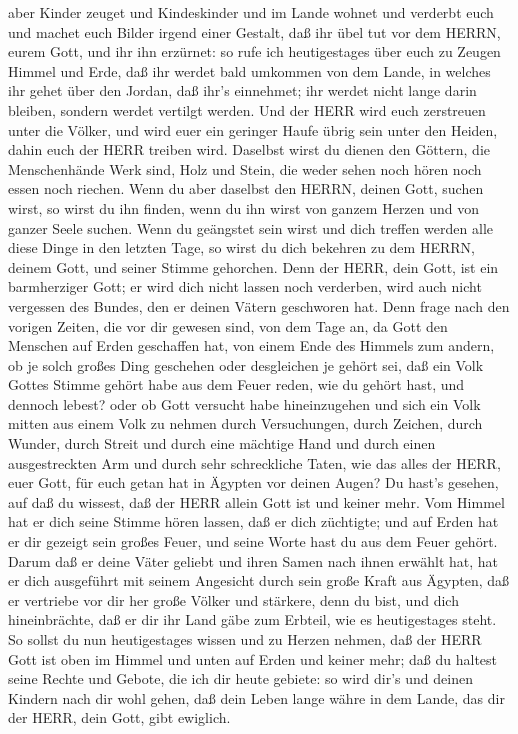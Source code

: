 aber Kinder zeuget und Kindeskinder und im Lande wohnet und verderbt
euch und machet euch Bilder irgend einer Gestalt, daß ihr übel tut vor
dem HERRN, eurem Gott, und ihr ihn erzürnet:  so rufe ich
heutigestages über euch zu Zeugen Himmel und Erde, daß ihr werdet bald
umkommen von dem Lande, in welches ihr gehet über den Jordan, daß ihr's
einnehmet; ihr werdet nicht lange darin bleiben, sondern werdet vertilgt
werden.  Und der HERR wird euch zerstreuen unter die
Völker, und wird euer ein geringer Haufe übrig sein unter den Heiden,
dahin euch der HERR treiben wird.  Daselbst wirst du dienen
den Göttern, die Menschenhände Werk sind, Holz und Stein, die weder
sehen noch hören noch essen noch riechen.  Wenn du aber
daselbst den HERRN, deinen Gott, suchen wirst, so wirst du ihn finden,
wenn du ihn wirst von ganzem Herzen und von ganzer Seele suchen.
 Wenn du geängstet sein wirst und dich treffen werden alle
diese Dinge in den letzten Tage, so wirst du dich bekehren zu dem HERRN,
deinem Gott, und seiner Stimme gehorchen.  Denn der HERR,
dein Gott, ist ein barmherziger Gott; er wird dich nicht lassen noch
verderben, wird auch nicht vergessen des Bundes, den er deinen Vätern
geschworen hat.  Denn frage nach den vorigen Zeiten, die
vor dir gewesen sind, von dem Tage an, da Gott den Menschen auf Erden
geschaffen hat, von einem Ende des Himmels zum andern, ob je solch
großes Ding geschehen oder desgleichen je gehört sei,  daß
ein Volk Gottes Stimme gehört habe aus dem Feuer reden, wie du gehört
hast, und dennoch lebest?  oder ob Gott versucht habe
hineinzugehen und sich ein Volk mitten aus einem Volk zu nehmen durch
Versuchungen, durch Zeichen, durch Wunder, durch Streit und durch eine
mächtige Hand und durch einen ausgestreckten Arm und durch sehr
schreckliche Taten, wie das alles der HERR, euer Gott, für euch getan
hat in Ägypten vor deinen Augen?  Du hast's gesehen, auf
daß du wissest, daß der HERR allein Gott ist und keiner mehr.
 Vom Himmel hat er dich seine Stimme hören lassen, daß er
dich züchtigte; und auf Erden hat er dir gezeigt sein großes Feuer, und
seine Worte hast du aus dem Feuer gehört.  Darum daß er
deine Väter geliebt und ihren Samen nach ihnen erwählt hat, hat er dich
ausgeführt mit seinem Angesicht durch sein große Kraft aus Ägypten,
 daß er vertriebe vor dir her große Völker und stärkere,
denn du bist, und dich hineinbrächte, daß er dir ihr Land gäbe zum
Erbteil, wie es heutigestages steht.  So sollst du nun
heutigestages wissen und zu Herzen nehmen, daß der HERR Gott ist oben im
Himmel und unten auf Erden und keiner mehr;  daß du haltest
seine Rechte und Gebote, die ich dir heute gebiete: so wird dir's und
deinen Kindern nach dir wohl gehen, daß dein Leben lange währe in dem
Lande, das dir der HERR, dein Gott, gibt ewiglich.

